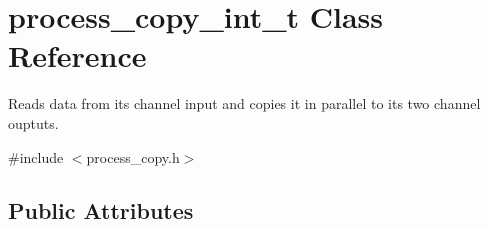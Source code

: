 \hypertarget{structprocess__copy__int__t}{}\section{process\+\_\+copy\+\_\+int\+\_\+t Class Reference}
\label{structprocess__copy__int__t}


Reads data from its channel input and copies it in parallel to its two channel ouptuts.  




{\ttfamily \#include $<$process\+\_\+copy.\+h$>$}

\subsection*{Public Attributes}
